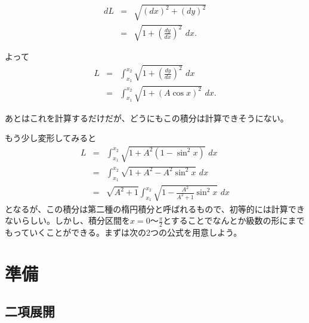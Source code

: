 \begin{eqnarray*}
dL & = & \sqrt{(dx)^2 + (dy)^2} \\
& = & \sqrt{1 + \left(\frac{dy}{dx}\right)^2}\,\,dx.
\end{eqnarray*}
\newline\par
よって
\begin{eqnarray*}
L & = & \int_{x_1}^{x_2} \sqrt{1 + \left(\frac{dy}{dx}\right)^2}\,\,dx \\
& = & \int_{x_1}^{x_2} \sqrt{1 + (A\cos x)^2}\,\,dx.
\end{eqnarray*}

あとはこれを計算するだけだが、どうにもこの積分は計算できそうにない。\par
もう少し変形してみると
\begin{eqnarray*}
L & = & \int_{x_1}^{x_2} \sqrt{1 + A^2(1 - \sin^2 x)}\,\,dx \\
& = & \int_{x_1}^{x_2} \sqrt{1 + A^2 - A^2\sin^2 x}\,\,dx \\
& = & \sqrt{A^2 + 1} \int_{x_1}^{x_2} \sqrt{1 - \frac{A^2}{A^2 + 1}\sin^2 x}\,\,dx
\end{eqnarray*}
となるが、この積分は第二種の楕円積分と呼ばれるもので、初等的には計算できないらしい。しかし、積分区間を$x =0〜\frac{\pi}{2}$とすることでなんとか級数の形にまでもっていくことができる。まずは次の2つの公式を用意しよう。


\section{準備}

\subsection{二項展開}

